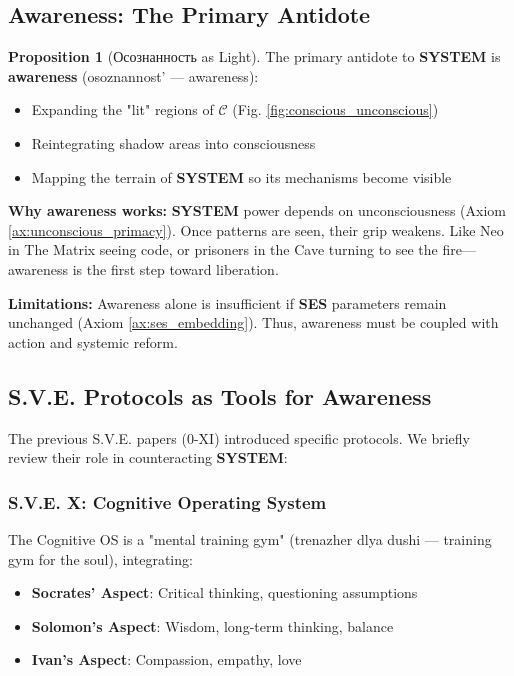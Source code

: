 \documentclass[11pt,a4paper]{article}
\newcommand{\SYSTEM}{\textbf{SYSTEM}}
\newcommand{\SES}{\textbf{SES}}
\newcommand{\CC}{$\mathcal{C}$}
\theoremstyle{definition}
\newtheorem{proposition}{Proposition}[section]
\theoremstyle{remark}
\begin{document}
\subsection{Awareness: The Primary Antidote}

\begin{proposition}[Осознанность as Light]
\label{prop:awareness_antidote}
The primary antidote to \SYSTEM{} is \textbf{awareness} (osoznannost' — awareness):

\begin{itemize}
\item Expanding the "lit" regions of \CC{} (Fig. \ref{fig:conscious_unconscious})
\item Reintegrating shadow areas into consciousness
\item Mapping the terrain of \SYSTEM{} so its mechanisms become visible
\end{itemize}

\textbf{Why awareness works:} \SYSTEM{} power depends on unconsciousness (Axiom \ref{ax:unconscious_primacy}). Once patterns are seen, their grip weakens. Like Neo in The Matrix seeing code, or prisoners in the Cave turning to see the fire—awareness is the first step toward liberation.

\textbf{Limitations:} Awareness alone is insufficient if \SES{} parameters remain unchanged (Axiom \ref{ax:ses_embedding}). Thus, awareness must be coupled with action and systemic reform.
\end{proposition}

\subsection{S.V.E. Protocols as Tools for Awareness}

The previous S.V.E. papers (0-XI) introduced specific protocols. We briefly review their role in counteracting \SYSTEM{}:

\subsubsection{S.V.E. X: Cognitive Operating System}

\cite{sve10} The Cognitive OS is a "mental training gym" (trenazher dlya dushi — training gym for the soul), integrating:
\begin{itemize}
\item \textbf{Socrates' Aspect}: Critical thinking, questioning assumptions
\item \textbf{Solomon's Aspect}: Wisdom, long-term thinking, balance
\item \textbf{Ivan's Aspect}: Compassion, empathy, love
\end{itemize}
\end{document}

